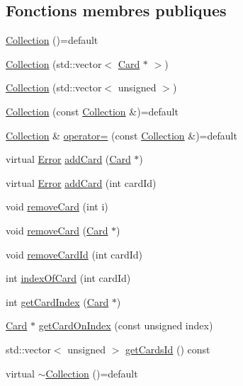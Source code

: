 \subsection*{Fonctions membres publiques}
\begin{DoxyCompactItemize}
\item 
\hyperlink{classCollection_a5a47d67f2f24553ea9adde4f4f286dc6}{Collection} ()=default
\item 
\hyperlink{classCollection_ab635b340b56740374abd52368087be0b}{Collection} (std\+::vector$<$ \hyperlink{classCard}{Card} $\ast$ $>$)
\item 
\hyperlink{classCollection_a68b48e6494b0a52b1c873c5fd8420007}{Collection} (std\+::vector$<$ unsigned $>$)
\item 
\hyperlink{classCollection_ac6947d19970d090b545eef22c101087d}{Collection} (const \hyperlink{classCollection}{Collection} \&)=default
\item 
\hyperlink{classCollection}{Collection} \& \hyperlink{classCollection_afdc6e54deac9226fda136ca4bb8a97a1}{operator=} (const \hyperlink{classCollection}{Collection} \&)=default
\item 
virtual \hyperlink{Error_8hpp_a2c3e4bb40f36b262a5214e2da2bca9c5}{Error} \hyperlink{classCollection_a430b67b03697286c696b9972de4b7b4b}{add\+Card} (\hyperlink{classCard}{Card} $\ast$)
\item 
virtual \hyperlink{Error_8hpp_a2c3e4bb40f36b262a5214e2da2bca9c5}{Error} \hyperlink{classCollection_a580daf9636192634d949951ceffba096}{add\+Card} (int card\+Id)
\item 
void \hyperlink{classCollection_ae7ee9c1b7e8619d2cf851e5c0dbd81b6}{remove\+Card} (int i)
\item 
void \hyperlink{classCollection_a2020d4aef89fd4c70141ce2e2d061ae9}{remove\+Card} (\hyperlink{classCard}{Card} $\ast$)
\item 
void \hyperlink{classCollection_a633b047916ca73598b08c019ffe6c4a5}{remove\+Card\+Id} (int card\+Id)
\item 
int \hyperlink{classCollection_a9bd74b104abcc47257564044be71a6b2}{index\+Of\+Card} (int card\+Id)
\item 
int \hyperlink{classCollection_aa7acabbd00d04898ffefce407645142e}{get\+Card\+Index} (\hyperlink{classCard}{Card} $\ast$)
\item 
\hyperlink{classCard}{Card} $\ast$ \hyperlink{classCollection_aced95e3b1de7bebeb22d9cb1d36d483b}{get\+Card\+On\+Index} (const unsigned index)
\item 
std\+::vector$<$ unsigned $>$ \hyperlink{classCollection_a1eaec13063d083a49ed9c26a4105d370}{get\+Cards\+Id} () const 
\item 
virtual \hyperlink{classCollection_ac7fe8e15953eee4ba235ee7ebc4ffc5b}{$\sim$\+Collection} ()=default
\end{DoxyCompactItemize}
